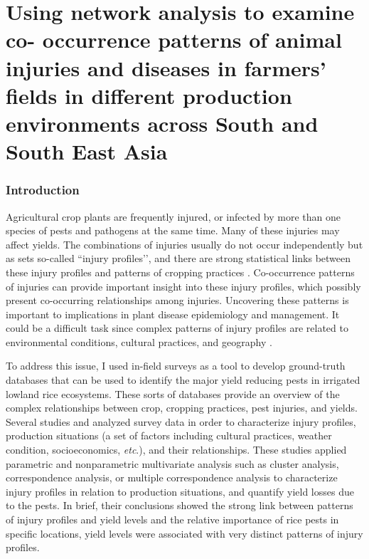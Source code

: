 \chapter{Using network analysis to examine co- occurrence patterns of animal injuries and diseases in farmers' fields in different production environments across South and South East Asia}

\subsection{Introduction}

Agricultural crop plants are frequently injured, or infected by more than one species of pests and pathogens at the same time. Many of these injuries may affect yields. The combinations of injuries usually do not occur independently but as sets so-called ``injury profiles’’, and there are strong statistical links between these injury profiles and patterns of cropping practices \citep{Savary_2006_Quantification}. Co-occurrence patterns of injuries can provide important insight into these injury profiles, which possibly present co-occurring relationships among injuries. Uncovering these patterns is important to implications in plant disease epidemiology and management. It could be a difficult task since complex patterns of injury profiles are related to environmental conditions, cultural practices, and geography \citep{Willocquet_2008_Simulating}. 

To address this issue, I used in-field surveys as a tool to develop ground-truth databases that can be used to identify the major yield reducing pests in irrigated lowland rice ecosystems. These sorts of databases provide an overview of the complex relationships between crop, cropping practices, pest injuries, and yields. Several studies \citet{Savary_2000_Quantification, Savary_2000_Characterization, Dong_2010_Characterization} and \citet{Reddy_2011_Characterizing} analyzed survey data in order to characterize injury profiles, production situations (a set of factors including cultural practices, weather condition, socioeconomics, \textit{etc}.), and their relationships. These studies applied parametric and nonparametric multivariate analysis such as cluster analysis, correspondence analysis, or multiple correspondence analysis to characterize injury profiles in relation to production situations, and quantify yield losses due to the pests. In brief, their conclusions showed the strong link between patterns of injury profiles and yield levels and the relative importance of rice pests in specific locations, yield levels were associated with very distinct patterns of injury profiles.

